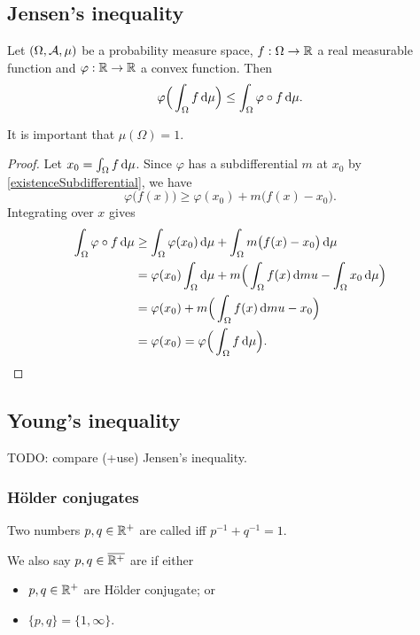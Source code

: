 \subsection{Jensen's inequality}
\begin{theorem}
Let $\sSet{\Omega, \mathcal{A}, \mu}$ be a probability measure space, $f:\Omega\to \mathbb{R}$ a real measurable function and $\varphi:\mathbb{R}\to \mathbb{R}$ a convex function. Then
\[ \varphi\Big(\int_\Omega f \operatorname{d \!}{\mu}\Big) \leq \int_\Omega \varphi\circ f \operatorname{d \!}{\mu}. \]
\end{theorem}
It is important that $\mu(\Omega) = 1$.
\begin{proof}
Let $x_0 = \int_\Omega f \operatorname{d \!}{\mu}$. Since $\varphi$ has a subdifferential $m$ at $x_0$ by \ref{existenceSubdifferential}, we have
\[ \varphi\big(f(x)\big) \geq \varphi(x_0) + m\big(f(x) - x_0\big). \]
Integrating over $x$ gives
\begin{align*}
\int_\Omega \varphi\circ f \diff{\mu} &\geq \int_\Omega\varphi(x_0)\diff{\mu} + \int_\Omega m\big(f(x) - x_0\big) \diff{\mu} \\
&= \varphi(x_0)\int_\Omega\diff{\mu} + m\Big(\int_\Omega f(x)\diff{mu} -\int_\Omega x_0 \diff{\mu}\Big) \\
&= \varphi(x_0) + m\Big(\int_\Omega f(x)\diff{mu} -x_0\Big) \\
&= \varphi(x_0) = \varphi\Big(\int_\Omega f \diff{\mu}\Big).
\end{align*}
\end{proof}

\subsection{Young's inequality}
TODO: compare (+use) Jensen's inequality.

\subsubsection{Hölder conjugates}
\begin{definition}
Two numbers $p,q\in \mathbb{R}^+$ are called  iff $p^{-1} + q^{-1} = 1$.

We also say $p,q \in \overline{\mathbb{R}^+}$ are  if either
\begin{itemize}
\item $p,q \in \mathbb{R}^+$ are Hölder conjugate; or
\item $\{p,q\} = \{1,\infty\}$.
\end{itemize}
\end{definition}

